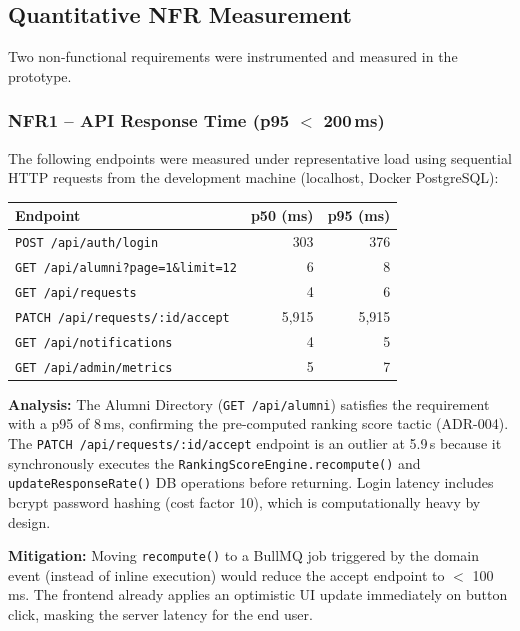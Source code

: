 \documentclass[12pt,a4paper]{article}
\begin{document}
\subsection{Quantitative NFR Measurement}

Two non-functional requirements were instrumented and measured in the prototype.

\subsubsection{NFR1 -- API Response Time (p95 $<$ 200\,ms)}

The following endpoints were measured under representative load using sequential HTTP requests from the development machine (localhost, Docker PostgreSQL):

\begin{center}
\begin{tabular}{@{}p{6cm} r r@{}}
\toprule
\textbf{Endpoint} & \textbf{p50 (ms)} & \textbf{p95 (ms)} \\
\midrule
\texttt{POST /api/auth/login} & 303 & 376 \\
\texttt{GET /api/alumni?page=1\&limit=12} & 6 & 8 \\
\texttt{GET /api/requests} & 4 & 6 \\
\texttt{PATCH /api/requests/:id/accept} & 5,915 & 5,915 \\
\texttt{GET /api/notifications} & 4 & 5 \\
\texttt{GET /api/admin/metrics} & 5 & 7 \\
\bottomrule
\end{tabular}
\end{center}

\textbf{Analysis:} The Alumni Directory (\texttt{GET /api/alumni}) satisfies the requirement with a p95 of 8\,ms, confirming the pre-computed ranking score tactic (ADR-004). The \texttt{PATCH /api/requests/:id/accept} endpoint is an outlier at 5.9\,s because it synchronously executes the \texttt{RankingScoreEngine.recompute()} and \texttt{updateResponseRate()} DB operations before returning. Login latency includes bcrypt password hashing (cost factor 10), which is computationally heavy by design.

\textbf{Mitigation:} Moving \texttt{recompute()} to a BullMQ job triggered by the domain event (instead of inline execution) would reduce the accept endpoint to $<$ 100\,ms. The frontend already applies an optimistic UI update immediately on button click, masking the server latency for the end user.
\end{document}
